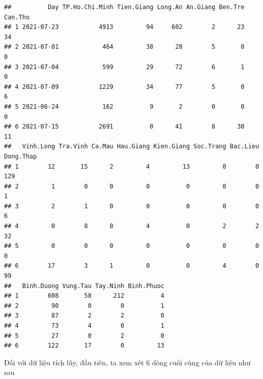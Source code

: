 \documentclass[../thesis.tex]{subfiles}
\begin{document}
\begin{verbatim}
##          Day TP.Ho.Chi.Minh Tien.Giang Long.An An.Giang Ben.Tre Can.Tho
## 1 2021-07-23           4913         94     602        2      23      34
## 2 2021-07-01            464         38      28        5       0       0
## 3 2021-07-04            599         29      72        6       1       0
## 4 2021-07-09           1229         34      77        5       0       6
## 5 2021-06-24            162          9       2        0       0       0
## 6 2021-07-15           2691          0      41        8      30      11
##   Vinh.Long Tra.Vinh Ca.Mau Hau.Giang Kien.Giang Soc.Trang Bac.Lieu Dong.Thap
## 1        12       15      2         4         13         0        0       129
## 2         1        0      0         0          0         0        0         1
## 3         2        1      0         0          0         0        0         6
## 4         0        8      0         4          0         2        2        32
## 5         0        0      0         0          0         0        0         0
## 6        17        3      1         0          0         4        0        99
##   Binh.Duong Vung.Tau Tay.Ninh Binh.Phuoc
## 1        608       58      212          4
## 2         90        0        0          1
## 3         87        2        2          0
## 4         73        4        0          1
## 5         27        0        2          0
## 6        122       17        0         13
\end{verbatim}

\newpage
Đối với dữ liệu tích lũy, đầu tiên, ta xem xét 6 dòng cuối cùng của dữ liệu như sau

\begin{Shaded}
	\begin{Highlighting}[]
\SpecialCharTok{\%\textgreater{}\%} \NormalTok{()}
	\end{Highlighting}
\end{Shaded}
\end{document}
